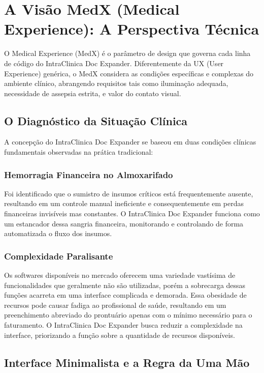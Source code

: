  \chapter{A Visão MedX (Medical Experience): A Perspectiva Técnica}

O Medical Experience (MedX) é o parâmetro de design que governa cada linha de código do IntraClinica Doc Expander. Diferentemente da UX (User Experience) genérica, o MedX considera as condições específicas e complexas do ambiente clínico, abrangendo requisitos tais como iluminação adequada, necessidade de assepsia estrita, e valor do contato visual.

\section{O Diagnóstico da Situação Clínica}

A concepção do IntraClinica Doc Expander se baseou em duas condições clínicas fundamentais observadas na prática tradicional:

\subsection{Hemorragia Financeira no Almoxarifado}
Foi identificado que o sumistro de insumos críticos está frequentemente ausente, resultando em um controle manual ineficiente e consequentemente em perdas financeiras invisíveis mas constantes. O IntraClinica Doc Expander funciona como um estancador dessa sangria financeira, monitorando e controlando de forma automatizada o fluxo dos insumos.

\subsection{Complexidade Paralisante}
Os softwares disponíveis no mercado oferecem uma variedade vastísima de funcionalidades que geralmente não são utilizadas, porém a sobrecarga dessas funções acarreta em uma interface complicada e demorada. Essa obesidade de recursos pode causar fadiga ao profissional de saúde, resultando em um preenchimento abreviado do prontuário apenas com o mínimo necessário para o faturamento. O IntraClinica Doc Expander busca reduzir a complexidade na interface, priorizando a função sobre a quantidade de recursos disponíveis.

\section{Interface Minimalista e a Regra da Uma Mão}

